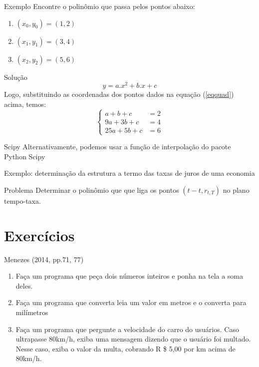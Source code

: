 \documentclass{beamer}
\begin{document}
	\begin{frame}{Exemplo}
		Encontre o polinômio que passa pelos pontos abaixo:
		\begin{enumerate}
			\item $(x_0,y_0)=(1,2)$
			\item $(x_1,y_1)=(3,4)$
			\item $(x_2,y_2)=(5,6)$
		\end{enumerate}
	\end{frame}
	
	
	
	
	\begin{frame}{Solução}
		\begin{equation}\label{eqquad}
		y=a.x^2+b.x+c
		\end{equation}
		Logo, substituindo as coordenadas dos pontos dados na equação (\ref{eqquad}) acima, temos:
		\begin{displaymath}\left\{
		\begin{array}{lr}
		a+b+c & = 2 \\
		9a+3b+c & = 4 \\
		25a+5b+c & = 6
		\end{array}
		\right.
		\end{displaymath}
	\end{frame}
	
	\begin{frame}{Scipy}
		Alternativamente, podemos usar a função de interpolação do pacote Python Scipy
	\end{frame}
	
	\begin{frame}{Exemplo: determinação da estrutura a termo das taxas de juros de uma economia}
		\begin{block}{Problema}
			Determinar o polinômio que que liga os pontos \begin{math}
			(t-t, r_{t,T})
			\end{math} no plano tempo-taxa.
		\end{block}
	\end{frame}
	
	
	
	
	
	
	
	\section{Exercícios}
	
	
	
	\begin{frame}{Menezes (2014, pp.71, 77)}
		\begin{enumerate}
			\item Faça um programa que peça dois números inteiros e ponha na tela a soma deles.
			\item Faça um programa que converta leia um valor em metros e o converta para milímetros
			\item Faça um programa que pergunte a velocidade do carro do usuários.  Caso ultrapasse 80km/h, exiba uma mensagem dizendo que o usuário foi multado.  Nesse caso, exiba o valor da multa, cobrando R \$ 5,00 por km acima de 80km/h.
		\end{enumerate}
	\end{frame}
	
\end{document}
